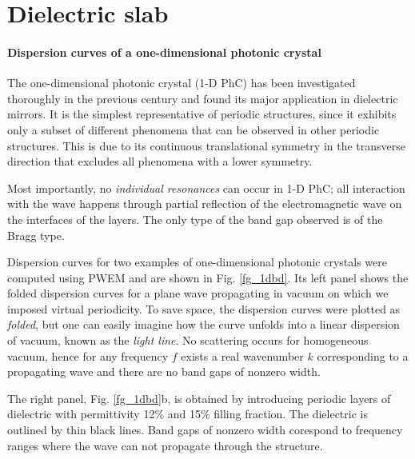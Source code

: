 \label{chapter_results}
\section{Dielectric slab} \label{section_Dielectric slab}%
\paragraph{Dispersion curves of a one-dimensional photonic crystal}%
The one-dimensional photonic crystal (1-D PhC) has been investigated thoroughly in the previous century and found its major application in dielectric mirrors. It is the simplest representative of periodic structures, since  it exhibits only a subset of different phenomena that can be observed in other periodic structures. This is due to its continuous translational symmetry in the transverse direction that excludes all phenomena with a lower symmetry. 

Most importantly, no \textit{individual resonances} can occur in 1-D PhC; all interaction with the wave happens through partial reflection of the electromagnetic wave on the interfaces of the layers. The only type of the band gap observed is of the Bragg type.

Dispersion curves for two examples of one-dimensional photonic crystals were computed using PWEM and are shown in Fig. \ref{fg_1dbd}. 
Its left panel shows the folded dispersion curves for a plane wave propagating in vacuum on which we imposed virtual periodicity. To save space, the dispersion curves were plotted as \textit{folded}, but one can easily imagine how the curve unfolds into a linear dispersion of vacuum, known as the \textit{light line}. No scattering occurs for homogeneous vacuum, hence for any frequency $f$ exists a real wavenumber $k$ corresponding to a propagating wave and there are no band gaps of nonzero width. 

The right panel, Fig. \ref{fg_1dbd}b, is obtained by introducing periodic layers of dielectric with permittivity 12\% and 15\% filling fraction. The dielectric is outlined by thin black lines. Band gaps of nonzero width corespond to frequency ranges where the wave can not propagate through the structure. %

